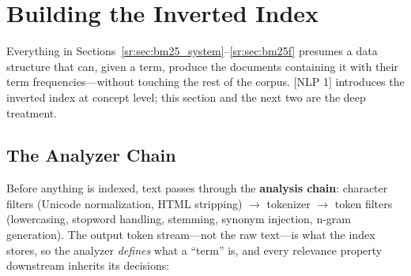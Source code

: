 \section{Building the Inverted Index}
\label{sr:sec:index_construction}

Everything in Sections~\ref{sr:sec:bm25_system}--\ref{sr:sec:bm25f} presumes a data structure that can, given a term, produce the documents containing it with their term frequencies---without touching the rest of the corpus. [NLP 1] introduces the inverted index at concept level; this section and the next two are the deep treatment.

\subsection{The Analyzer Chain}

Before anything is indexed, text passes through the \textbf{analysis chain}: character filters (Unicode normalization, HTML stripping) $\rightarrow$ tokenizer $\rightarrow$ token filters (lowercasing, stopword handling, stemming, synonym injection, n-gram generation). The output token stream---not the raw text---is what the index stores, so the analyzer \emph{defines} what a ``term'' is, and every relevance property downstream inherits its decisions:

